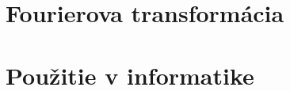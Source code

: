 %
%


\chapter{Fourierova transformácia}
    
    
    
    
    
    
    
    

%    
%    
%    
%    
%    
%    
%    
%    
%    
%    

\chapter{Použitie v informatike}
%    
%    
%    
%    
%    
         
%    
%    
%    
%    
    
    
    
    
    
    
    
    
    


